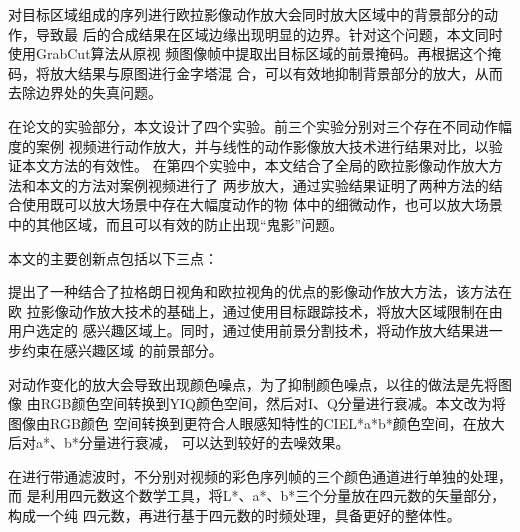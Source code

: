 对目标区域组成的序列进行欧拉影像动作放大会同时放大区域中的背景部分的动作，导致最
后的合成结果在区域边缘出现明显的边界。针对这个问题，本文同时使用GrabCut算法从原视
频图像帧中提取出目标区域的前景掩码。再根据这个掩码，将放大结果与原图进行金字塔混
合，可以有效地抑制背景部分的放大，从而去除边界处的失真问题。

在论文的实验部分，本文设计了四个实验。前三个实验分别对三个存在不同动作幅度的案例
视频进行动作放大，并与线性的动作影像放大技术进行结果对比，以验证本文方法的有效性。
在第四个实验中，本文结合了全局的欧拉影像动作放大方法和本文的方法对案例视频进行了
两步放大，通过实验结果证明了两种方法的结合使用既可以放大场景中存在大幅度动作的物
体中的细微动作，也可以放大场景中的其他区域，而且可以有效的防止出现“鬼影”问题。

本文的主要创新点包括以下三点：

\begin{compactenum}
\item 提出了一种结合了拉格朗日视角和欧拉视角的优点的影像动作放大方法，该方法在欧
  拉影像动作放大技术的基础上，通过使用目标跟踪技术，将放大区域限制在由用户选定的
  感兴趣区域上。同时，通过使用前景分割技术，将动作放大结果进一步约束在感兴趣区域
  的前景部分。
\item 对动作变化的放大会导致出现颜色噪点，为了抑制颜色噪点，以往的做法是先将图像
  由RGB颜色空间转换到YIQ颜色空间，然后对I、Q分量进行衰减。本文改为将图像由RGB颜色
  空间转换到更符合人眼感知特性的CIEL*a*b*颜色空间，在放大后对a*、b*分量进行衰减，
  可以达到较好的去噪效果。
\item 在进行带通滤波时，不分别对视频的彩色序列帧的三个颜色通道进行单独的处理，而
  是利用四元数这个数学工具，将L*、a*、b*三个分量放在四元数的矢量部分，构成一个纯
  四元数，再进行基于四元数的时频处理，具备更好的整体性。
\end{compactenum}







